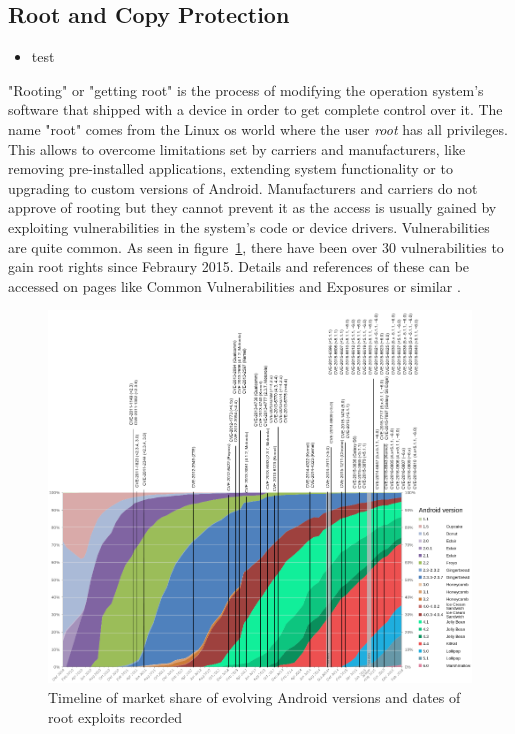 \subsection{Root and Copy Protection} \label{subsection:android-copyroot}
\begin{itemize}
    \item test
\end{itemize}
"Rooting" or "getting root" is the process of modifying the operation system's software that shipped with a device in order to get complete control over it.
The name "root" comes from the Linux \gls{os} world where the user \textit{root} has all privileges.
This allows to overcome limitations set by carriers and manufacturers, like removing pre-installed applications, extending system functionality or to upgrading to custom versions of Android.
Manufacturers and carriers do not approve of rooting but they cannot prevent it as the access is usually gained by exploiting vulnerabilities in the system's code or device drivers.
Vulnerabilities are quite common.
As seen in figure~\ref{fig:root}, there have been over 30 vulnerabilities to gain root rights since Febraury 2015.
Details and references of these can be accessed on pages like Common Vulnerabilities and Exposures or similar \cite{cveAndroidPriv} \cite{cveDetails}.
\newline
\begin{figure}[h]
    \centering
    \includegraphics[width=1\textwidth]{data/timeline.png}
    \caption{Timeline of market share of evolving Android versions and dates of root exploits recorded \cite{distributionRoot} \cite{androidVulnerabilities} \cite{cveAndroidPriv} \cite{cveDetails}}
    \label{fig:root}
\end{figure}
